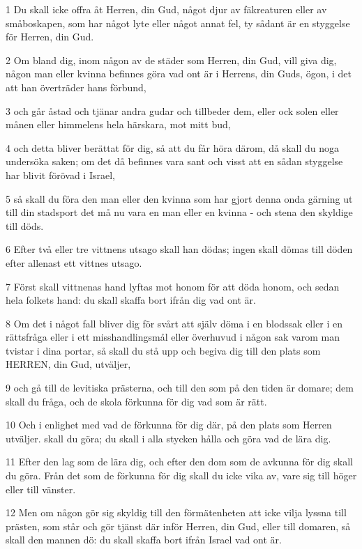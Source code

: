 \par 1 Du skall icke offra åt Herren, din Gud, något djur av fäkreaturen eller av småboskapen, som har något lyte eller något annat fel, ty sådant är en styggelse för Herren, din Gud.
\par 2 Om bland dig, inom någon av de städer som Herren, din Gud, vill giva dig, någon man eller kvinna befinnes göra vad ont är i Herrens, din Guds, ögon, i det att han överträder hans förbund,
\par 3 och går åstad och tjänar andra gudar och tillbeder dem, eller ock solen eller månen eller himmelens hela härskara, mot mitt bud,
\par 4 och detta bliver berättat för dig, så att du får höra därom, då skall du noga undersöka saken; om det då befinnes vara sant och visst att en sådan styggelse har blivit förövad i Israel,
\par 5 så skall du föra den man eller den kvinna som har gjort denna onda gärning ut till din stadsport det må nu vara en man eller en kvinna - och stena den skyldige till döds.
\par 6 Efter två eller tre vittnens utsago skall han dödas; ingen skall dömas till döden efter allenast ett vittnes utsago.
\par 7 Först skall vittnenas hand lyftas mot honom för att döda honom, och sedan hela folkets hand: du skall skaffa bort ifrån dig vad ont är.
\par 8 Om det i något fall bliver dig för svårt att själv döma i en blodssak eller i en rättsfråga eller i ett misshandlingsmål eller överhuvud i någon sak varom man tvistar i dina portar, så skall du stå upp och begiva dig till den plats som HERREN, din Gud, utväljer,
\par 9 och gå till de levitiska prästerna, och till den som på den tiden är domare; dem skall du fråga, och de skola förkunna för dig vad som är rätt.
\par 10 Och i enlighet med vad de förkunna för dig där, på den plats som Herren utväljer. skall du göra; du skall i alla stycken hålla och göra vad de lära dig.
\par 11 Efter den lag som de lära dig, och efter den dom som de avkunna för dig skall du göra. Från det som de förkunna för dig skall du icke vika av, vare sig till höger eller till vänster.
\par 12 Men om någon gör sig skyldig till den förmätenheten att icke vilja lyssna till prästen, som står och gör tjänst där inför Herren, din Gud, eller till domaren, så skall den mannen dö: du skall skaffa bort ifrån Israel vad ont är.
